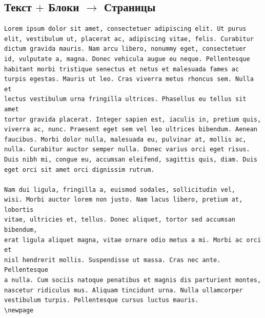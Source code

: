 \documentclass[
	layoutmode=block,
	blockwidth=96mm, blockheight=108mm,
	bleed=0mm,
	bindingoffset=0mm,
	imageblockwidth=0.98, imageblockheight=0.98,
	imageblockoffsettop=0mm,
	12pt,final,openany
]{photobook}
\begin{document}

\begin{page}%
\scriptsize%
\vfill%
\begin{center}%
\end{center}%
\vfill%
\end{page}
%
\pagecolor{lightgray}
\pagecolor{white}



\begin{spreadtopages}
	\vfill
	\begin{center}
		\section*{Текст $+$ Блоки $\longrightarrow$ Страницы}
	\end{center}
	\vfill
\end{spreadtopages}
\newpage



\begin{page}
\fontsize{5pt}{5.5pt}\selectfont
\vfill
\begin{center}
\begin{BVerbatim}
Lorem ipsum dolor sit amet, consectetuer adipiscing elit. Ut purus
elit, vestibulum ut, placerat ac, adipiscing vitae, felis. Curabitur
dictum gravida mauris. Nam arcu libero, nonummy eget, consectetuer
id, vulputate a, magna. Donec vehicula augue eu neque. Pellentesque
habitant morbi tristique senectus et netus et malesuada fames ac
turpis egestas. Mauris ut leo. Cras viverra metus rhoncus sem. Nulla et
lectus vestibulum urna fringilla ultrices. Phasellus eu tellus sit amet
tortor gravida placerat. Integer sapien est, iaculis in, pretium quis,
viverra ac, nunc. Praesent eget sem vel leo ultrices bibendum. Aenean
faucibus. Morbi dolor nulla, malesuada eu, pulvinar at, mollis ac,
nulla. Curabitur auctor semper nulla. Donec varius orci eget risus.
Duis nibh mi, congue eu, accumsan eleifend, sagittis quis, diam. Duis
eget orci sit amet orci dignissim rutrum.

Nam dui ligula, fringilla a, euismod sodales, sollicitudin vel,
wisi. Morbi auctor lorem non justo. Nam lacus libero, pretium at, lobortis
vitae, ultricies et, tellus. Donec aliquet, tortor sed accumsan bibendum,
erat ligula aliquet magna, vitae ornare odio metus a mi. Morbi ac orci et
nisl hendrerit mollis. Suspendisse ut massa. Cras nec ante. Pellentesque
a nulla. Cum sociis natoque penatibus et magnis dis parturient montes,
nascetur ridiculus mus. Aliquam tincidunt urna. Nulla ullamcorper
vestibulum turpis. Pellentesque cursus luctus mauris.
\newpage
\end{BVerbatim}
\end{center}
\vfill
\null
\end{page}
\end{document}
